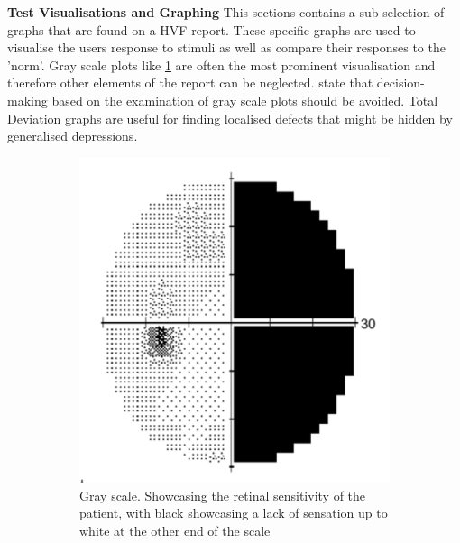 \documentclass{l4proj}
\begin{document}
\textbf{Test Visualisations and Graphing} \newline
This sections contains a sub selection of graphs that are found on a HVF report. These specific graphs are used to visualise the users response to stimuli as well as compare their responses to the 'norm'. Gray scale plots like \ref{fig:example_gs} are often the most prominent visualisation and therefore other elements of the report can be neglected. \citet{Chauhan2008PracticalRecommendations} state that decision-making based on the examination of gray scale plots should be avoided. Total Deviation graphs are useful for finding localised defects that might be hidden by generalised depressions.
\begin{figure}[htbp]
    \centering
    \begin{subfigure}[b]{0.45\textwidth}
        \includegraphics[width=\textwidth]{dissertation/images/Grayscale_Example.png}
        \caption{Gray scale. Showcasing the retinal sensitivity of the patient, with black showcasing a lack of sensation up to white at the other end of the scale}
        \label{fig:example_gs}
    \end{subfigure}
    ~
    \begin{subfigure}[b]{0.45\textwidth}

\end{subfigure}
\end{figure}
\end{document}
